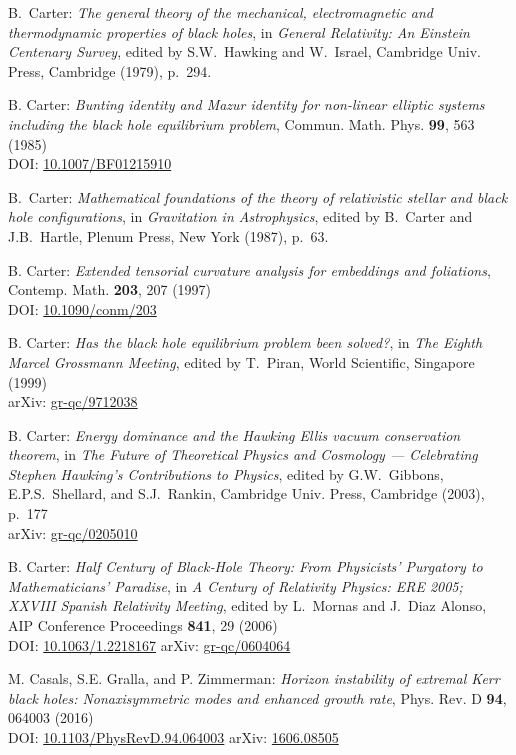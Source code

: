 \begin{thebibliography}{123}
B.~Carter:
{\em The general theory of the mechanical, electromagnetic and thermodynamic properties of black holes}, in {\em General Relativity: An Einstein Centenary Survey},
edited by S.W.~Hawking and W.~Israel,
Cambridge Univ. Press, Cambridge (1979), p.~294.

B. Carter:
{\em Bunting identity and Mazur identity for non-linear elliptic systems including the black hole equilibrium problem},
Commun. Math. Phys. {\bf 99}, 563 (1985)\\
DOI: \href{https://doi.org/10.1007/BF01215910}{10.1007/BF01215910}

B.~Carter:
{\em Mathematical foundations of the theory of
relativistic stellar and black hole configurations},
in {\em Gravitation in Astrophysics}, edited by B.~Carter and J.B.~Hartle,
Plenum Press, New York (1987), p.~63.

B. Carter:
{\em Extended tensorial curvature analysis for embeddings and foliations},
Contemp. Math. {\bf 203}, 207 (1997)\\
DOI: \href{http://dx.doi.org/10.1090/conm/203}{10.1090/conm/203}

B. Carter: {\em Has the black hole equilibrium problem been solved?},
in {\em The Eighth Marcel Grossmann Meeting}, edited by T.~Piran,
World Scientific, Singapore (1999)\\
arXiv: \href{https://arxiv.org/abs/gr-qc/9712038}{gr-qc/9712038}

B. Carter: {\em Energy dominance and the Hawking Ellis vacuum conservation theorem},
in {\em The Future of Theoretical Physics and Cosmology ---
Celebrating Stephen Hawking's Contributions to Physics}, edited by G.W.~Gibbons, E.P.S.~Shellard,
and S.J.~Rankin,
Cambridge Univ. Press, Cambridge (2003), p.~177\\
arXiv: \href{https://arxiv.org/abs/gr-qc/0205010}{gr-qc/0205010}

B. Carter:
{\em Half Century of Black‐Hole Theory: From Physicists' Purgatory to Mathematicians' Paradise},
in {\em A Century of Relativity Physics: ERE 2005; XXVIII Spanish Relativity Meeting},
edited by L.~Mornas and J.~Diaz Alonso,
AIP Conference Proceedings {\bf 841}, 29 (2006)\\
DOI: \href{https://doi.org/10.1063/1.2218167}{10.1063/1.2218167}\hfill
arXiv: \href{https://arxiv.org/abs/gr-qc/0604064}{gr-qc/0604064}

M. Casals, S.E. Gralla, and P. Zimmerman:
{\em Horizon instability of extremal Kerr black holes: Nonaxisymmetric modes and enhanced growth rate},
Phys. Rev. D {\bf 94}, 064003 (2016)\\
DOI: \href{https://doi.org/10.1103/PhysRevD.94.064003}{10.1103/PhysRevD.94.064003}\hfill
arXiv: \href{https://arxiv.org/abs/1606.08505}{1606.08505}


\end{thebibliography}
